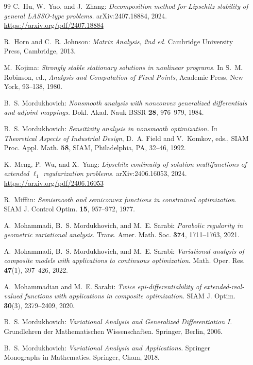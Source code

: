 \documentclass[reqno]{amsart}
\numberwithin{equation}{section}
\begin{document}
\begin{thebibliography}{99}
{\sc C.~Hu, W.~Yao, and J.~Zhang:}
{\em Decomposition method for Lipschitz stability of general LASSO-type problems.}
arXiv:2407.18884, 2024.
\url{https://arxiv.org/pdf/2407.18884}

{\sc R.~Horn and C.~R. Johnson:}
{\em Matrix Analysis, 2nd ed.}
Cambridge University Press, Cambridge, 2013.

{\sc M.~Kojima:}
{\em Strongly stable stationary solutions in nonlinear programs.}
In S.~M. Robinson, ed., {\em Analysis and Computation of Fixed Points}, Academic Press, New York, 93--138, 1980.

{\sc B.~S. Mordukhovich:}
{\em Nonsmooth analysis with nonconvex generalized differentials and adjoint mappings.}
Dokl. Akad. Nauk BSSR {\bf 28}, 976--979, 1984.

{\sc B.~S. Mordukhovich:}
{\em Sensitivity analysis in nonsmooth optimization.}
In {\em Theoretical Aspects of Industrial Design}, D.~A. Field and V.~Komkov, eds., SIAM Proc. Appl. Math. {\bf 58}, SIAM, Philadelphia, PA, 32--46, 1992.

{\sc K.~Meng, P.~Wu, and X.~Yang:}
{\em Lipschitz continuity of solution multifunctions of extended $\ell_1$ regularization problems.}
arXiv:2406.16053, 2024.
\url{https://arxiv.org/pdf/2406.16053}

{\sc R.~Mifflin:}
{\em Semismooth and semiconvex functions in constrained optimization.}
SIAM J. Control Optim. {\bf 15}, 957--972, 1977.

{\sc A.~Mohammadi, B.~S. Mordukhovich, and M.~E. Sarabi:}
{\em Parabolic regularity in geometric variational analysis.}
Trans. Amer. Math. Soc. {\bf 374}, 1711--1763, 2021.

{\sc A.~Mohammadi, B.~S. Mordukhovich, and M.~E. Sarabi:}
{\em Variational analysis of composite models with applications to continuous optimization.}
Math. Oper. Res. {\bf 47}(1), 397--426, 2022.

{\sc A.~Mohammadian and M.~E. Sarabi:}
{\em Twice epi-differentiability of extended-real-valued functions with applications in composite optimization.}
SIAM J. Optim. {\bf 30}(3), 2379--2409, 2020.

{\sc B.~S. Mordukhovich:}
{\em Variational Analysis and Generalized Differentiation I.}
Grundlehren der Mathematischen Wissenschaften. Springer, Berlin, 2006.

{\sc B.~S. Mordukhovich:}
{\em Variational Analysis and Applications.}
Springer Monographs in Mathematics. Springer, Cham, 2018.


\end{thebibliography}
\end{document}
